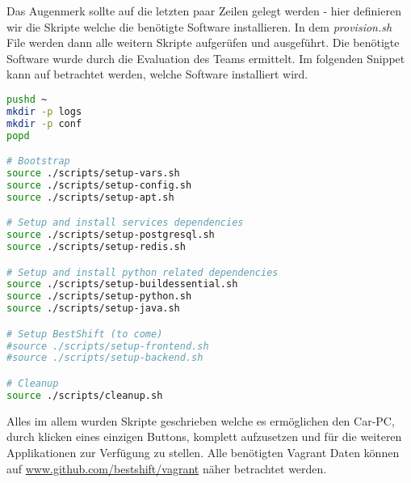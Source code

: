 Das Augenmerk sollte auf die letzten paar Zeilen gelegt werden - hier definieren wir die Skripte welche die benötigte Software installieren. In dem \textit{provision.sh} File werden dann alle weitern Skripte aufgerüfen und ausgeführt. Die benötigte Software wurde durch die Evaluation des Teams ermittelt. Im folgenden Snippet kann auf betrachtet werden, welche Software installiert wird.

\begin{lstlisting}[language=bash, caption=provision.sh]
pushd ~
mkdir -p logs
mkdir -p conf
popd

# Bootstrap
source ./scripts/setup-vars.sh
source ./scripts/setup-config.sh
source ./scripts/setup-apt.sh

# Setup and install services dependencies
source ./scripts/setup-postgresql.sh
source ./scripts/setup-redis.sh

# Setup and install python related dependencies
source ./scripts/setup-buildessential.sh
source ./scripts/setup-python.sh
source ./scripts/setup-java.sh

# Setup BestShift (to come)
#source ./scripts/setup-frontend.sh
#source ./scripts/setup-backend.sh

# Cleanup
source ./scripts/cleanup.sh
\end{lstlisting}

Alles im allem wurden Skripte geschrieben welche es ermöglichen den Car-PC, durch klicken eines einzigen Buttons, komplett aufzusetzen und für die weiteren Applikationen zur Verfügung zu stellen. Alle benötigten Vagrant Daten können auf \url{www.github.com/bestshift/vagrant} näher betrachtet werden.